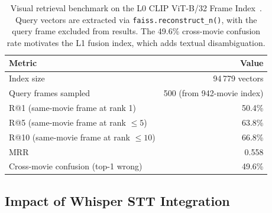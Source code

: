 \documentclass[11pt]{article}
\begin{document}
\begin{table}[!htb]
\centering
\begin{tabular}{>{\raggedright\arraybackslash}p{6.4cm} r}
\toprule
\textbf{Metric} & \textbf{Value} \\
\midrule
Index size                              & 94\,779 vectors \\
Query frames sampled                    & 500 (from 942-movie index) \\
R@1 (same-movie frame at rank 1)        & 50.4\% \\
R@5 (same-movie frame at rank $\leq5$)  & 63.8\% \\
R@10 (same-movie frame at rank $\leq10$)& 66.8\% \\
MRR                                     & 0.558 \\
Cross-movie confusion (top-1 wrong)     & 49.6\% \\
\bottomrule
\end{tabular}
\caption{Visual retrieval benchmark on the L0 CLIP ViT-B/32 Frame
Index~\cite{clip}.  Query vectors are extracted via
\texttt{faiss.reconstruct\_n()}, with the query frame excluded from results.
The 49.6\% cross-movie confusion rate motivates the L1 fusion index, which
adds textual disambiguation.}
\label{tab:visual_bench}
\end{table}

\subsection{Impact of Whisper STT Integration}
\end{document}
